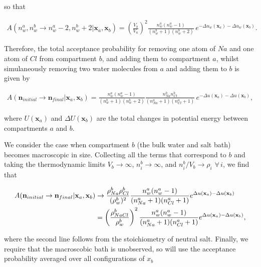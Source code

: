 \documentclass[11pt]{article} %
\begin{document}
so that

\begin{align}
A(n_w^a,n_w^b \rightarrow n_w^a - 2,n_w^b + 2|\mathbf{x}_a,\mathbf{x}_b) = \left(\frac{V_b}{V_a}\right)^2 \frac{n_w^a(n_w^a - 1)}{(n_w^b +1)(n_w^b +2)} \, e^{- \Delta u_w(\mathbf{x}_a)- \Delta u_w(\mathbf{x}_b)}.
\end{align}

Therefore, the total acceptance probability for removing one atom of $Na$ and one atom of $Cl$ from compartment $b$, and adding them to compartment $a$, whilst simulaneously removing two water molecules from $a$ and adding them to $b$ is given by

\begin{align}
A(\mathbf{n}_{initial} \rightarrow \mathbf{n}_{final}|\mathbf{x}_a,\mathbf{x}_b) =  \frac{n_w^a(n_w^a - 1)}{(n_w^b +1)(n_w^b +2)}\frac{n^b_{Na}n^b_{Cl}}{(n^a_{Na} + 1)(n^a_{Cl} + 1)} \, e^{- \Delta u(\mathbf{x}_a)- \Delta u(\mathbf{x}_b)},
\end{align}

where $U(\mathbf{x}_a)$ and $\Delta U(\mathbf{x}_b)$ are the total changes in potential energy between compartments $a$ and $b$. 

We consider the case when compartment $b$ (the bulk water and salt bath) becomes macroscopic in size. Collecting all the terms that correspond to $b$ and taking the thermodynamic limits $V_b \rightarrow \infty$, $n_i^b \rightarrow \infty$, and $n^b_i/V_b \rightarrow \rho_i$ $\forall \, i$, we find that

\begin{align}
A(\mathbf{n}_{initial} \rightarrow \mathbf{n}_{final}|\mathbf{x}_a,\mathbf{x}_b) &\rightarrow \frac{\rho_{Na}^b \rho_{Cl}^b}{(\rho_w^b)^2}\frac{n_w^a(n_w^a - 1)}{(n^a_{Na} + 1)(n^a_{Cl} + 1)}e^{\Delta u(\mathbf{x}_a)- \Delta u(\mathbf{x}_b)} \notag\\
&=\left(\frac{\rho_{NaCl}^b}{\rho_w^b}\right)^2\frac{n_w^a(n_w^a - 1)}{(n^a_{Na} + 1)(n^a_{Cl} + 1)}e^{\Delta u(\mathbf{x}_a)- \Delta u(\mathbf{x}_b)},
\end{align}

where the second line follows from the stoichiometry of neutral salt. Finally, we require that the macroscobic bath is unobserved, so will use the acceptance probability averaged over all configurations of $x_b$
\end{document}
